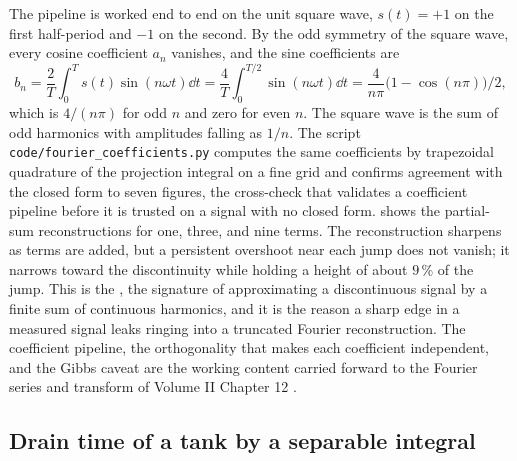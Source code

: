 The pipeline is worked end to end on the unit square wave, $s(t) = +1$
on the first half-period and $-1$ on the second. By the odd symmetry of
the square wave, every cosine coefficient $a_{n}$ vanishes, and the
sine coefficients are
\[
b_{n} = \frac{2}{T}\int_{0}^{T} s(t)\sin(n\omega t)\dd t =
\frac{4}{T}\int_{0}^{T/2}\sin(n\omega t)\dd t =
\frac{4}{n\pi}\bigl(1 - \cos(n\pi)\bigr)\big/2,
\]
which is $4/(n\pi)$ for odd $n$ and zero for even $n$. The square wave
is the sum of odd harmonics with amplitudes falling as $1/n$. The
script \texttt{code/fourier\_coefficients.py} computes the same
coefficients by trapezoidal quadrature of the projection integral on a
fine grid and confirms agreement with the closed form to seven
figures, the cross-check that validates a coefficient pipeline before
it is trusted on a signal with no closed form.
 shows the partial-sum
reconstructions for one, three, and nine terms. The reconstruction
sharpens as terms are added, but a persistent overshoot near each jump
does not vanish; it narrows toward the discontinuity while holding a
height of about $9\,\%$ of the jump. This is the , the signature of approximating a discontinuous signal by a
finite sum of continuous harmonics, and it is the reason a sharp edge
in a measured signal leaks ringing into a truncated Fourier
reconstruction. The coefficient pipeline, the orthogonality that makes
each coefficient independent, and the Gibbs caveat are the working
content carried forward to the Fourier series and transform of Volume
II Chapter 12 \cite{text:ch06-oppenheim-schafer-2010}.



\subsection{Drain time of a tank by a separable integral}

